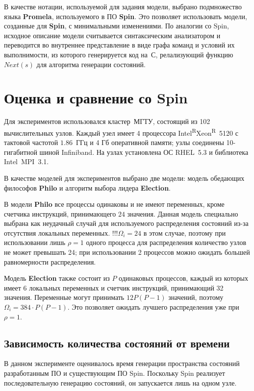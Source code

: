 \documentclass[12pt,a4paper,fleqn]{article}
\newcommand\regsign{\textsuperscript{\textcircled{\scriptsize{R}}}}
\newcommand{\Code}[1]{\textbf{\mbox{#1}}}
\begin{document}
В качестве нотации, используемой для задания модели, выбрано подмножество языка \Code{Promela},
используемого в ПО \Code{Spin}. Это позволяет использовать модели, созданные для \Code{Spin}, с
минимальными изменениями. По аналогии со Spin, исходное описание модели считывается синтаксическим
анализатором и переводится во внутреннее представление в виде графа команд и условий их
выполнимости, из которого генерируется код на~С, релализующий функцию $Next(s)$ для алгоритма
генерации состояний.

\section{Оценка и сравнение со Spin}

Для экспериментов использовался кластер~МГТУ, состоящий из 102 вычислительных
узлов. Каждый узел имеет 4 процессора Intel\regsign Xeon\regsign~5120 с тактовой частотой
$1.86$~ГГц и 4 Гб оперативной памяти; узлы соединены 10-гигабитной шиной Infiniband. На
узлах установлена ОС RHEL~5.3 и библиотека Intel~MPI~3.1.

В качестве моделей для экспериментов выбрано две модели: модель обедающих философов
\Code{Philo} и алгоритм выбора лидера \Code{Election}.

В модели \Code{Philo} все процессы одинаковы и не имеют переменных, кроме счетчика инструкций,
принимающего $24$ значения. Данная модель специально выбрана как неудачный случай для используемого
распределения состояний из-за отсутствия локальных переменных. !!!$\Omega_i = 24$ в этом случае,
поэтому при использовании лишь $\rho = 1$ одного процесса для распределения количество узлов не
может превышать 24; при использовании 2 процессов можно ожидать большей равномерности распределения.

Модель \Code{Election} также состоит из $P$ одинаковых процессов, каждый из которых имеет 6
локальных переменных и счетчик инструкций, принимающий 32 значения. Переменные могут принимать $12 P
(P-1)$ значений, поэтому $\Omega_i = 384\cdot P (P - 1)$. Это позволяет ожидать лучшего
распределения уже при $\rho = 1$.

\subsection{Зависимость количества состояний от времени}

В данном эксперименте оценивалось время генерации пространства состояний разработанным ПО и
существующим ПО Spin. Поскольку Spin реализует последовательную генерацию состояний, он запускается
лишь на одном узле.
\end{document}
